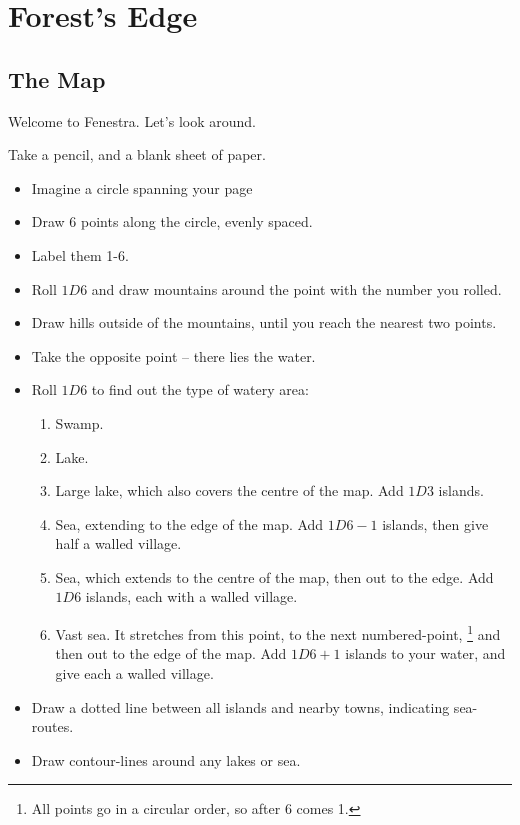 \chapter{Forest's Edge}

\section{The Map}

\begin{multicols}{2}

Welcome to Fenestra. Let's look around.


Take a pencil, and a blank sheet of paper.

\begin{itemize}
\item
  Imagine a circle spanning your page
\item
  Draw 6 points along the circle, evenly spaced.
\item
  Label them 1-6.
\item
  Roll $1D6$ and draw mountains around the point with the number you rolled.
\item
  Draw hills outside of the mountains, until you reach the nearest two
  points.
\item
  Take the opposite point -- there lies the water.
\item
  Roll $1D6$ to find out the type of watery area:

  \begin{enumerate}
  \item
    Swamp.
  \item
    Lake.
  \item
    Large lake, which also covers the centre of the map.
    Add $1D3$ islands.
  \item
    Sea, extending to the edge of the map.
    Add $1D6-1$ islands, then give half a walled village.
  \item
    Sea, which extends to the centre of the map, then out to the edge.
    Add $1D6$ islands, each with a walled village.
  \item
    Vast sea. It stretches from this point, to the next numbered-point,%
    \footnote{All points go in a circular order, so after 6 comes 1.}
    and then out to the edge of the map.
    Add $1D6+1$ islands to your water, and give each a walled village.
  \end{enumerate}
\item
  Draw a dotted line between all islands and nearby towns, indicating
  sea-routes.
\item
  Draw contour-lines around any lakes or sea.
\end{itemize}


\end{multicols}
